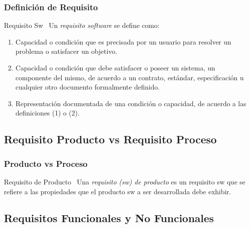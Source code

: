\documentclass[handout,a4paper,slidestop,xcolor=pst,dvips,blue]{beamer}
\begin{document}
\begin{frame}
    \frametitle{Definición de Requisito}
    \begin{block}{Requisito Sw~\cite{ieee:seGlossary}}
        Un \alert{\emph{requisito software}} se define como:
        \begin{enumerate}
            \item<2-> Capacidad o condición que es precisada por un usuario para resolver un problema o satisfacer un objetivo.
            \item<3-> Capacidad o condición que debe satisfacer o poseer un sistema, un componente del mismo, de acuerdo a un contrato, estándar, especificación u cualquier otro documento formalmente definido.
            \item<4-> Representación documentada de una condición o capacidad, de acuerdo a las definiciones (1) o (2).
        \end{enumerate}
    \end{block}
\end{frame}

\subsection{Requisito Producto vs Requisito Proceso}

\begin{frame}
    \frametitle{Producto vs Proceso}
    \begin{block}{Requisito de Producto~\cite{ieee:swebok}}
            Una \alert{\emph{requisito (sw) de producto}} es un requisito sw que se refiere a las propiedades que el producto sw a ser desarrollada debe exhibir.
    \end{block}
\end{frame}

\subsection{Requisitos Funcionales y No Funcionales}
\end{document}
